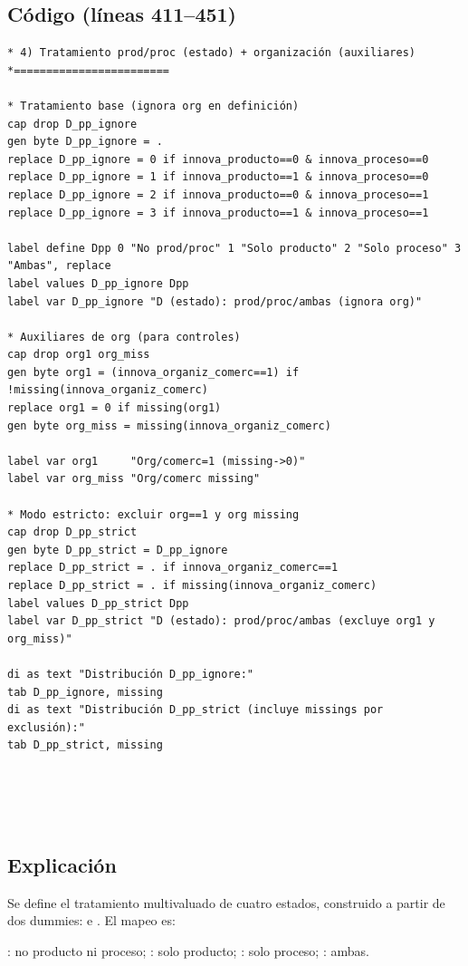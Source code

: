 \documentclass[12pt]{article}
\newcommand{\ttt}[1]{\texttt{\detokenize{#1}}}
\begin{document}
\subsection*{Código (líneas 411--451)}
\begin{lstlisting}
* 4) Tratamiento prod/proc (estado) + organización (auxiliares)
*========================

* Tratamiento base (ignora org en definición)
cap drop D_pp_ignore
gen byte D_pp_ignore = .
replace D_pp_ignore = 0 if innova_producto==0 & innova_proceso==0
replace D_pp_ignore = 1 if innova_producto==1 & innova_proceso==0
replace D_pp_ignore = 2 if innova_producto==0 & innova_proceso==1
replace D_pp_ignore = 3 if innova_producto==1 & innova_proceso==1

label define Dpp 0 "No prod/proc" 1 "Solo producto" 2 "Solo proceso" 3 "Ambas", replace
label values D_pp_ignore Dpp
label var D_pp_ignore "D (estado): prod/proc/ambas (ignora org)"

* Auxiliares de org (para controles)
cap drop org1 org_miss
gen byte org1 = (innova_organiz_comerc==1) if !missing(innova_organiz_comerc)
replace org1 = 0 if missing(org1)
gen byte org_miss = missing(innova_organiz_comerc)

label var org1     "Org/comerc=1 (missing->0)"
label var org_miss "Org/comerc missing"

* Modo estricto: excluir org==1 y org missing
cap drop D_pp_strict
gen byte D_pp_strict = D_pp_ignore
replace D_pp_strict = . if innova_organiz_comerc==1
replace D_pp_strict = . if missing(innova_organiz_comerc)
label values D_pp_strict Dpp
label var D_pp_strict "D (estado): prod/proc/ambas (excluye org1 y org_miss)"

di as text "Distribución D_pp_ignore:"
tab D_pp_ignore, missing
di as text "Distribución D_pp_strict (incluye missings por exclusión):"
tab D_pp_strict, missing





\end{lstlisting}
\subsection*{Explicación}
Se define el tratamiento multivaluado de cuatro estados, construido a partir de dos dummies: \ttt{innova\_producto} e \ttt{innova\_proceso}. El mapeo es:

\ttt{0}: no producto ni proceso; \ttt{1}: solo producto; \ttt{2}: solo proceso; \ttt{3}: ambas.
\end{document}
